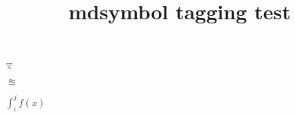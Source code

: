 \documentclass{article}
\title{mdsymbol tagging test}
\begin{document}
\circledR

\circledS

\yen

\dagger

\ddagger

\mathparagraph

\mathsection

\mathdollar

\mathsterling

$\doublebarwedge$

$\approxeq$

$\int_i^j f(x)$
\end{document}
